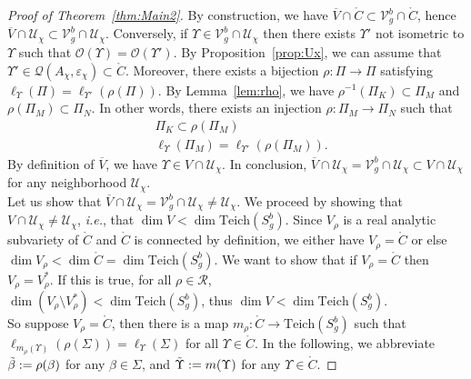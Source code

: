 \documentclass[a4paper,12pt]{article}
\theoremstyle{definition}
\theoremstyle{remark}
\begin{document}
\begin{proof}[Proof of Theorem~\ref{thm:Main2}]
    
    
    
    By construction, we have $\overline{V} \cap \mathring{C} \subset \mathcal{V}_g^b \cap \mathring{C}$, hence $\overline{V} \cap \mathcal{U}_\chi \subset \mathcal{V}_g^b \cap \mathcal{U}_\chi$. Conversely, if $\Upsilon \in \mathcal{V}_g^b \cap \mathcal{U}_\chi$ then there exists $\Upsilon'$ not isometric to $\Upsilon$ such that $\mathcal{O}(\Upsilon)=\mathcal{O}(\Upsilon')$. By Proposition~\ref{prop:Ux}, we can assume that $\Upsilon' \in \mathcal{Q}(A_\chi,\varepsilon_\chi) \subset \mathring{C}$. Moreover, there exists a bijection $\rho : \Pi \to \Pi$ satisfying $\ell_{\Upsilon} (\Pi)=\ell_{\Upsilon'}(\rho (\Pi)) $. By Lemma~\ref{lem:rho}, we have $\rho^{-1}(\Pi_K) \subset \Pi_M $ and $\rho(\Pi_M) \subset \Pi_N$. In other words, there exists an injection $\rho : \Pi_M \to \Pi_N$ such that
    \begin{align*}
        &\Pi_K \subset \rho(\Pi_M) \\
        &\ell_{\Upsilon} (\Pi_M) = \ell_{\Upsilon'} (\rho (\Pi_M)).
    \end{align*}
    By definition of $\overline{V}$, we have $\Upsilon \in V \cap \mathcal{U}_\chi$. In conclusion, $\overline{V} \cap \mathcal{U}_\chi = \mathcal{V}_g^b \cap \mathcal{U}_\chi \subset V \cap \mathcal{U}_\chi$ for any neighborhood $\mathcal{U}_\chi$. \\
    
    Let us show that $\overline{V} \cap \mathcal{U}_\chi = \mathcal{V}_g^b \cap \mathcal{U}_\chi \neq \mathcal{U}_\chi$. We proceed by showing that $V \cap \mathcal{U}_\chi \neq \mathcal{U}_\chi$, \textit{i.e.}, that $\dim V < \dim \mathrm{Teich}(S_g^b)$. Since $V_{\rho}$ is a real analytic subvariety of $\mathring{C}$ and $\mathring{C}$ is connected by definition, we either have $V_{\rho}=\mathring{C}$ or else $\dim V_{\rho} < \dim \mathring{C} = \dim \mathrm{Teich}(S_g^b)$. We want to show that if $V_{\rho}=\mathring{C}$ then $V_{\rho}=V_{\rho}^*$. If this is true, for all $\rho \in \mathcal{R}$, \\
    $\dim(V_{\rho}\setminus V_{\rho}^*)<\dim \mathrm{Teich}(S_g^b)  $, thus $\dim V <\dim \mathrm{Teich}(S_g^b)$.\\
    
    So suppose $V_{\rho}=\mathring{C}$, then there is a map $m_{\rho} : \mathring{C} \to \mathrm{Teich}(S_g^b)$ such that \\
    $\ell_{m_{\rho}(\Upsilon)} (\rho (\Sigma))=\ell_{\Upsilon} (\Sigma)$ for all $\Upsilon \in \mathring{C}$. In the following, we abbreviate $\Tilde{\beta}:=\rho(\beta)$ for any $\beta \in \Sigma$, and $\Tilde{\Upsilon}:=m(\Upsilon)$ for any $\Upsilon \in \mathring{C}$.
    

\end{proof}
\end{document}
